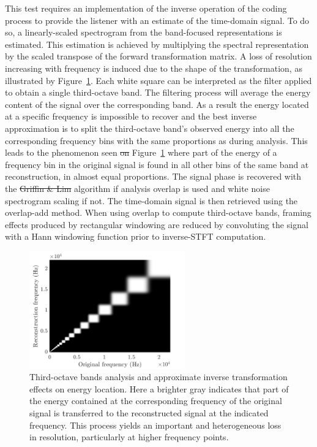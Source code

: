 \documentclass[sensors,article,accept,moreauthors,pdftex,10pt,a4paper]{mdpi}
\providecommand{\DIFaddtex}[1]{{\protect\color{blue}\uwave{#1}}} %
\providecommand{\DIFdeltex}[1]{{\protect\color{red}\sout{#1}}}                      %
\providecommand{\DIFaddbegin}{} %
\providecommand{\DIFaddend}{} %
\providecommand{\DIFdelbegin}{} %
\providecommand{\DIFdelend}{} %
\providecommand{\DIFaddFL}[1]{\DIFadd{#1}} %
\providecommand{\DIFaddbeginFL}{} %
\providecommand{\DIFaddendFL}{} %
\providecommand{\DIFadd}[1]{\texorpdfstring{\DIFaddtex{#1}}{#1}} %
\providecommand{\DIFdel}[1]{\texorpdfstring{\DIFdeltex{#1}}{}} %
\begin{document}
This test requires an implementation of the inverse operation of the coding process to provide the listener with an estimate of the time-domain signal. To do so, a linearly-scaled spectrogram from the band-focused representations is estimated. This estimation is achieved by multiplying the spectral representation by the scaled transpose of the forward transformation matrix. A loss of resolution increasing with frequency is induced due to the shape of the transformation, as illustrated by Figure~\ref{fig:freq}. Each white square can be interpreted as the filter applied to obtain a single third-octave band. The filtering process will average the energy content of the signal over the corresponding band. As a result the energy located at a specific frequency is impossible to recover and the best inverse approximation is to split the third-octave band's observed energy into all the corresponding frequency bins with the same proportions as during analysis. This leads to the phenomenon seen \DIFdelbegin \DIFdel{on }\DIFdelend \DIFaddbegin {\DIFadd{in}} \DIFaddend Figure~\ref{fig:freq} where part of the energy of a frequency bin in the original signal is found in all other bins of the same band at reconstruction, in almost equal proportions. The signal phase is recovered with the \DIFdelbegin \DIFdel{Griffin \& Lim }\DIFdelend \DIFaddbegin {\DIFadd{Griffin--Lim}} \DIFaddend algorithm \cite{griffin1984} if analysis overlap is used and white noise spectrogram scaling if not. The time-domain signal is then retrieved using the overlap-add method. When using overlap to compute third-octave bands, framing effects produced by rectangular windowing are reduced by convoluting the signal with a Hann windowing function prior to inverse-STFT computation.


\begin{figure}[H]
	\centering
		\includegraphics[width=0.6\textwidth]{figures/freq.png}
	\caption{Third-octave bands analysis and approximate inverse transformation effects on energy location. \DIFaddbeginFL {\DIFaddendFL Here\DIFaddbeginFL \DIFaddFL{,}} \DIFaddendFL a brighter gray indicates that part of the energy contained at the corresponding frequency of the original signal is transferred to the reconstructed signal at the indicated frequency. This process yields an important and heterogeneous loss in resolution, particularly at higher frequency points.}
	\label{fig:freq}
\end{figure}
\end{document}

